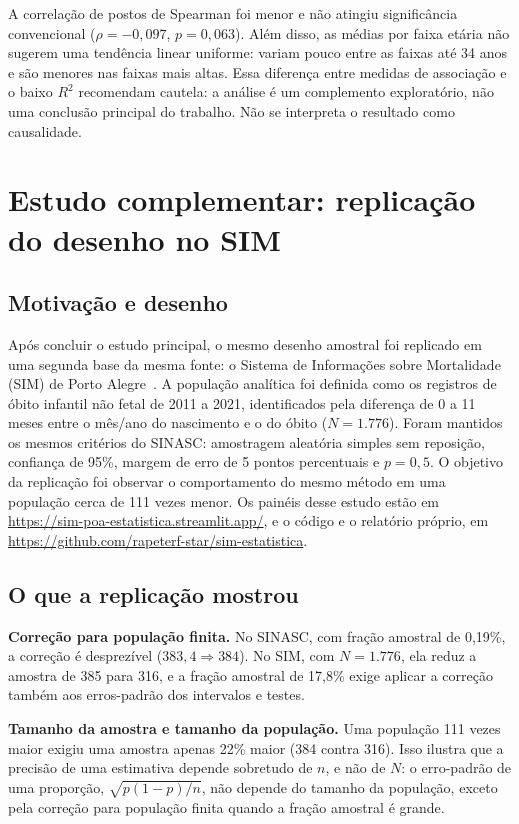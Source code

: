 \documentclass[12pt,a4paper]{article}
\begin{document}
A correlação de postos de Spearman foi menor e não atingiu significância convencional (\(\rho=-0{,}097\), \(p=0{,}063\)). Além disso, as médias por faixa etária não sugerem uma tendência linear uniforme: variam pouco entre as faixas até 34 anos e são menores nas faixas mais altas. Essa diferença entre medidas de associação e o baixo \(R^2\) recomendam cautela: a análise é um complemento exploratório, não uma conclusão principal do trabalho. Não se interpreta o resultado como causalidade.

\section{Estudo complementar: replicação do desenho no SIM}

\subsection{Motivação e desenho}

Após concluir o estudo principal, o mesmo desenho amostral foi replicado em uma segunda base da mesma fonte: o Sistema de Informações sobre Mortalidade (SIM) de Porto Alegre~\cite{simpoa}. A população analítica foi definida como os registros de óbito infantil não fetal de 2011 a 2021, identificados pela diferença de 0 a 11 meses entre o mês/ano do nascimento e o do óbito (\(N=1.776\)). Foram mantidos os mesmos critérios do SINASC: amostragem aleatória simples sem reposição, confiança de 95\%, margem de erro de 5 pontos percentuais e \(p=0{,}5\). O objetivo da replicação foi observar o comportamento do mesmo método em uma população cerca de 111 vezes menor. Os painéis desse estudo estão em \url{https://sim-poa-estatistica.streamlit.app/}, e o código e o relatório próprio, em \url{https://github.com/rapeterf-star/sim-estatistica}.

\subsection{O que a replicação mostrou}

\textbf{Correção para população finita.} No SINASC, com fração amostral de 0,19\%, a correção é desprezível (\(383{,}4 \Rightarrow 384\)). No SIM, com \(N=1.776\), ela reduz a amostra de 385 para 316, e a fração amostral de 17,8\% exige aplicar a correção também aos erros-padrão dos intervalos e testes.

\textbf{Tamanho da amostra e tamanho da população.} Uma população 111 vezes maior exigiu uma amostra apenas 22\% maior (384 contra 316). Isso ilustra que a precisão de uma estimativa depende sobretudo de \(n\), e não de \(N\): o erro-padrão de uma proporção, \(\sqrt{p(1-p)/n}\), não depende do tamanho da população, exceto pela correção para população finita quando a fração amostral é grande.
\end{document}
